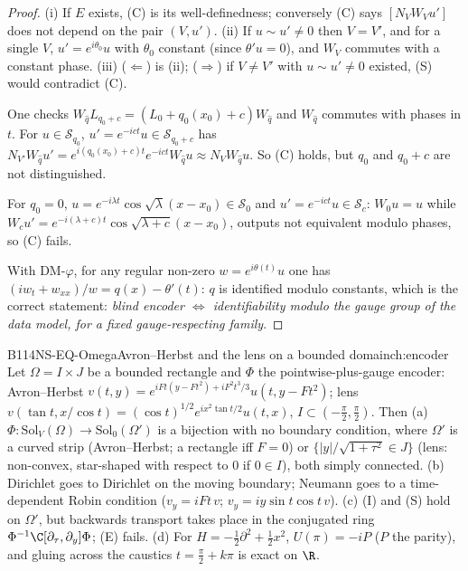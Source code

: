 \begin{proof}
(i) If $E$ exists, (C) is its well-definedness; conversely (C) says $[N_VW_Vu']$ does not depend on the pair $(V,u')$. (ii) If $u\sim u'\ne0$ then $V=V'$, and for a single $V$, $u'=e^{i\theta_0}u$ with $\theta_0$ constant (since $\theta'u=0$), and $W_V$ commutes with a constant phase. (iii) ($\Leftarrow$) is (ii); ($\Rightarrow$) if $V\ne V'$ with $u\sim u'\ne0$ existed, (S) would contradict (C).

One checks $W_{\hat q}L_{q_0+c}=(L_0+q_0(x_0)+c)W_{\hat q}$ and $W_{\hat q}$ commutes with phases in $t$. For $u\in\mathcal S_{q_0}$, $u'=e^{-ict}u\in\mathcal S_{q_0+c}$ has $N_{V'}W_{\hat q}u'=e^{i(q_0(x_0)+c)t}e^{-ict}W_{\hat q}u\approx N_VW_{\hat q}u$. So (C) holds, but $q_0$ and $q_0+c$ are not distinguished.

For $q_0=0$, $u=e^{-i\lambda t}\cos\sqrt\lambda(x-x_0)\in\mathcal S_0$ and $u'=e^{-ict}u\in\mathcal S_c$: $W_0u=u$ while $W_cu'=e^{-i(\lambda+c)t}\cos\sqrt{\lambda+c}(x-x_0)$, outputs not equivalent modulo phases, so (C) fails.

With DM-$\varphi$, for any regular non-zero $w=e^{i\theta(t)}u$ one has $(iw_t+w_{xx})/w=q(x)-\theta'(t)$: $q$ is identified modulo constants, which is the correct statement: \emph{blind encoder $\iff$ identifiability modulo the gauge group of the data model, for a fixed gauge-respecting family}.

\end{proof}

\begin{dimcard}{B114}{NS-EQ-Omega}{Avron--Herbst and the lens on a bounded domain}{\pw}{ch:encoder}
Let $\Omega=I\times J$ be a bounded rectangle and $\Phi$ the pointwise-plus-gauge encoder: Avron--Herbst $v(t,y)=e^{iFt(y-Ft^2)+iF^2t^3/3}u(t,y-Ft^2)$; lens $v(\tan t,x/\cos t)=(\cos t)^{1/2}e^{ix^2\tan t/2}u(t,x)$, $I\subset(-\frac\pi2,\frac\pi2)$. Then (a) $\Phi:\mathrm{Sol}_V(\Omega)\to\mathrm{Sol}_0(\Omega')$ is a bijection with no boundary condition, where $\Omega'$ is a curved strip (Avron--Herbst; a rectangle iff $F=0$) or $\{|y|/\sqrt{1+\tau^2}\in J\}$ (lens: non-convex, star-shaped with respect to $0$ if $0\in I$), both simply connected. (b) Dirichlet goes to Dirichlet on the moving boundary; Neumann goes to a time-dependent Robin condition ($v_y=iFt\,v$; $v_y=iy\sin t\cos t\,v$). (c) (I) and (S) hold on $\Omega'$, but backwards transport takes place in the conjugated ring $\Phi^{-1}\C[\partial_\tau,\partial_y]\Phi$; (E) fails. (d) For $H=-\frac12\partial^2+\frac12x^2$, $U(\pi)=-iP$ ($P$ the parity), and gluing across the caustics $t=\frac\pi2+k\pi$ is exact on $\R$.
\end{dimcard}

